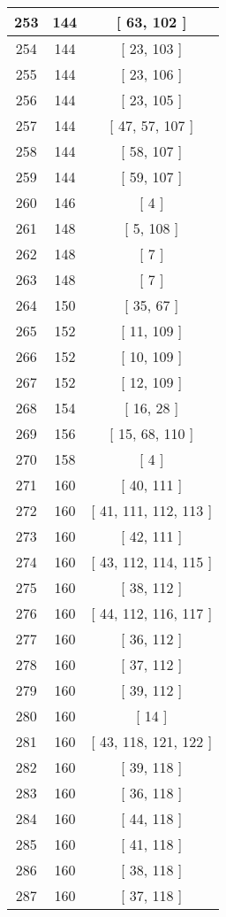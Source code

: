 \begin{center}
\begin{longtable}[H]{|| c c c ||}
\hline
253 & 144 & [ 63, 102 ] \\ 
\hline
254 & 144 & [ 23, 103 ] \\ 
\hline
255 & 144 & [ 23, 106 ] \\ 
\hline
256 & 144 & [ 23, 105 ] \\ 
\hline
257 & 144 & [ 47, 57, 107 ] \\ 
\hline
258 & 144 & [ 58, 107 ] \\ 
\hline
259 & 144 & [ 59, 107 ] \\ 
\hline
260 & 146 & [ 4 ] \\ 
\hline
261 & 148 & [ 5, 108 ] \\ 
\hline
262 & 148 & [ 7 ] \\ 
\hline
263 & 148 & [ 7 ] \\ 
\hline
264 & 150 & [ 35, 67 ] \\ 
\hline
265 & 152 & [ 11, 109 ] \\ 
\hline
266 & 152 & [ 10, 109 ] \\ 
\hline
267 & 152 & [ 12, 109 ] \\ 
\hline
268 & 154 & [ 16, 28 ] \\ 
\hline
269 & 156 & [ 15, 68, 110 ] \\ 
\hline
270 & 158 & [ 4 ] \\ 
\hline
271 & 160 & [ 40, 111 ] \\ 
\hline
272 & 160 & [ 41, 111, 112, 113 ] \\ 
\hline
273 & 160 & [ 42, 111 ] \\ 
\hline
274 & 160 & [ 43, 112, 114, 115 ] \\ 
\hline
275 & 160 & [ 38, 112 ] \\ 
\hline
276 & 160 & [ 44, 112, 116, 117 ] \\ 
\hline
277 & 160 & [ 36, 112 ] \\ 
\hline
278 & 160 & [ 37, 112 ] \\ 
\hline
279 & 160 & [ 39, 112 ] \\ 
\hline
280 & 160 & [ 14 ] \\ 
\hline
281 & 160 & [ 43, 118, 121, 122 ] \\ 
\hline
282 & 160 & [ 39, 118 ] \\ 
\hline
283 & 160 & [ 36, 118 ] \\ 
\hline
284 & 160 & [ 44, 118 ] \\ 
\hline
285 & 160 & [ 41, 118 ] \\ 
\hline
286 & 160 & [ 38, 118 ] \\ 
\hline
287 & 160 & [ 37, 118 ] \\ 

\end{longtable}
\end{center}
